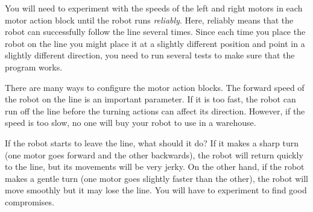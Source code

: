 You will need to experiment with the speeds of the left and right motors
in each motor action block until the robot runs \emph{reliably}. Here,
reliably means that the robot can successfully follow the line several
times. Since each time you place the robot on the line you might place
it at a slightly different position and point in a slightly different
direction, you need to run several tests to make sure that the program
works.

There are many ways to configure the motor action blocks. The forward
speed of the robot on the line is an important parameter. If it is too
fast, the robot can run off the line before the turning actions can
affect its direction. However, if the speed is too slow, no one will buy
your robot to use in a warehouse.

If the robot starts to leave the line, what should it do? If it makes a
sharp turn (one motor goes forward and the other backwards), the robot
will return quickly to the line, but its movements will be very jerky.
On the other hand, if the robot makes a gentle turn (one motor goes
slightly faster than the other), the robot will move smoothly but it may
lose the line. You will have to experiment to find good compromises.

\newpage


\bigskip


\bigskip


